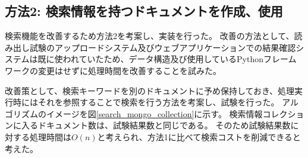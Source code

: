 \newpage
\subsection{方法2: 検索情報を持つドキュメントを作成、使用}

検索機能を改善するため方法2を考案し、実装を行った。
改善の方法として、読み出し試験のアップロードシステム及びウェブアプリケーションでの結果確認システムは既に使われていたため、データ構造及び使用しているPythonフレームワークの変更はせずに処理時間を改善することを試みた。

改善策として、検索キーワードを別のドキュメントに予め保持しておき、処理実行時にはそれを参照することで検索を行う方法を考案し、試験を行った。
アルゴリズムのイメージを図\ref{search_mongo_collection}に示す。
検索情報コレクションに入るドキュメント数は、試験結果数と同じである。
そのため試験結果数に対する処理時間は$O(n)$と考えられ、方法1に比べて検索コストを削減できると考えた。

